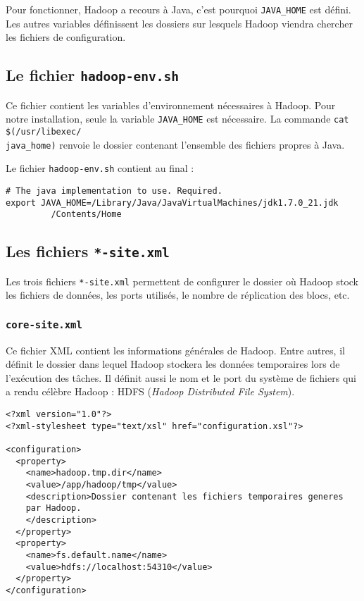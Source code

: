 \par Pour fonctionner, Hadoop a recours à Java, c'est pourquoi \texttt{JAVA\_HOME} est défini. Les autres variables définissent les dossiers sur lesquels Hadoop viendra chercher les fichiers de configuration.

\subsection{Le fichier \texttt{hadoop-env.sh}}

\par Ce fichier contient les variables d'environnement nécessaires à Hadoop. Pour notre installation, seule la variable \texttt{JAVA\_HOME} est nécessaire. La commande \texttt{cat} \texttt{\$(/usr/libexec/\\java\_home)} renvoie le dossier contenant l'ensemble des fichiers propres à Java.

\par Le fichier \texttt{hadoop-env.sh} contient au final :

\begin{verbatim}
# The java implementation to use. Required.
export JAVA_HOME=/Library/Java/JavaVirtualMachines/jdk1.7.0_21.jdk
		 /Contents/Home
\end{verbatim}

\subsection{Les fichiers \texttt{*-site.xml}}

\par Les trois fichiers \texttt{*-site.xml} permettent de configurer le dossier où Hadoop stock les fichiers de données, les ports utilisés, le nombre de réplication des blocs, etc.

\subsubsection{\texttt{core-site.xml}}

\par Ce fichier XML contient les informations générales de Hadoop. Entre autres, il définit le dossier dans lequel Hadoop stockera les données temporaires lors de l'exécution des tâches. Il définit aussi le nom et le port du système de fichiers qui a rendu célèbre Hadoop : HDFS (\emph{Hadoop Distributed File System}).

\begin{verbatim}
<?xml version="1.0"?>
<?xml-stylesheet type="text/xsl" href="configuration.xsl"?>

<configuration>
  <property>
    <name>hadoop.tmp.dir</name>
    <value>/app/hadoop/tmp</value>
    <description>Dossier contenant les fichiers temporaires generes
    par Hadoop.
    </description>
  </property>
  <property>
    <name>fs.default.name</name>
    <value>hdfs://localhost:54310</value>
  </property>
</configuration>
\end{verbatim}

